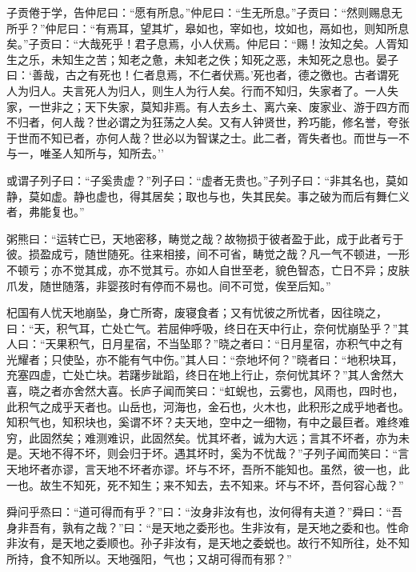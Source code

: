 \documentclass[]{article}
\begin{document}
子贡倦于学，告仲尼曰：``愿有所息。''仲尼曰：``生无所息。''子贡曰：``然则赐息无所乎？''仲尼曰：``有焉耳，望其圹，皋如也，宰如也，坟如也，鬲如也，则知所息矣。''子贡曰：``大哉死乎！君子息焉，小人伏焉。仲尼曰：``赐！汝知之矣。人胥知生之乐，未知生之苦；知老之惫，未知老之佚；知死之恶，未知死之息也。晏子曰：`善哉，古之有死也！仁者息焉，不仁者伏焉。'死也者，德之徼也。古者谓死人为归人。夫言死人为归人，则生人为行人矣。行而不知归，失家者了。一人失家，一世非之；天下失家，莫知非焉。有人去乡土、离六亲、废家业、游于四方而不归者，何人哉？世必谓之为狂荡之人矣。又有人钟贤世，矜巧能，修名誉，夸张于世而不知已者，亦何人哉？世必以为智谋之士。此二者，胥失者也。而世与一不与一，唯圣人知所与，知所去。''

或谓子列子曰：``子奚贵虚？''列子曰：``虚者无贵也。''子列子曰：``非其名也，莫如静，莫如虚。静也虚也，得其居矣；取也与也，失其民矣。事之破为而后有舞仁义者，弗能复也。''

粥熊曰：``运转亡已，天地密移，畴觉之哉？故物损于彼者盈于此，成于此者亏于彼。损盈成亏，随世随死。往来相接，间不可省，畴觉之哉？凡一气不顿进，一形不顿亏；亦不觉其成，亦不觉其亏。亦如人自世至老，貌色智态，亡日不异；皮肤爪发，随世随落，非婴孩时有停而不易也。间不可觉，俟至后知。''

杞国有人忧天地崩坠，身亡所寄，废寝食者；又有忧彼之所忧者，因往晓之，曰：``天，积气耳，亡处亡气。若屈伸呼吸，终日在天中行止，奈何忧崩坠乎？''其人曰：``天果积气，日月星宿，不当坠耶？''晓之者曰：``日月星宿，亦积气中之有光耀者；只使坠，亦不能有气中伤。''其人曰：``奈地坏何？''晓者曰：``地积块耳，充塞四虚，亡处亡块。若躇步跐蹈，终日在地上行止，奈何忧其坏？''其人舍然大喜，晓之者亦舍然大喜。长庐子闻而笑曰：``虹蜺也，云雾也，风雨也，四时也，此积气之成乎天者也。山岳也，河海也，金石也，火木也，此积形之成乎地者也。知积气也，知积块也，奚谓不坏？夫天地，空中之一细物，有中之最巨者。难终难穷，此固然矣；难测难识，此固然矣。忧其坏者，诚为大远；言其不坏者，亦为未是。天地不得不坏，则会归于坏。遇其坏时，奚为不忧哉？''子列子闻而笑曰：``言天地坏者亦谬，言天地不坏者亦谬。坏与不坏，吾所不能知也。虽然，彼一也，此一也。故生不知死，死不知生；来不知去，去不知来。坏与不坏，吾何容心哉？''

舜问乎烝曰：``道可得而有乎？''曰：``汝身非汝有也，汝何得有夫道？''舜曰：``吾身非吾有，孰有之哉？''曰：``是天地之委形也。生非汝有，是天地之委和也。性命非汝有，是天地之委顺也。孙子非汝有，是天地之委蜕也。故行不知所往，处不知所持，食不知所以。天地强阳，气也；又胡可得而有邪？''
\end{document}
